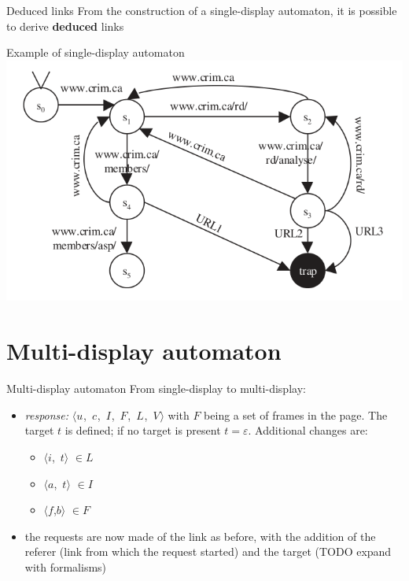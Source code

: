 \documentclass[usenames,dvipsnames]{beamer}
\newcommand{\tuple}[1]{\mbox{$\langle$#1$\rangle$}}
\newcommand{\resmulti}[1][]{
  \ifthenelse{\equal{#1}{}}{\mbox{$\langle u$, $c$, $I$, $F$, $L$, $V\rangle$}}
  {\mbox{$\langle u_{#1}$, $c_{#1}$, $I_{#1}$, $F_{#1}$, $L_{#1}$, $V_{#1}\rangle$}}
}
\theoremstyle{definition}
\begin{document}
\begin{frame}{Deduced links}
  From the construction of a single-display automaton, it is possible to derive \textbf{deduced} links
\end{frame}

\begin{frame}{Example of single-display automaton}
  \includegraphics[width=\textwidth]{../img/session_automaton_example.png}
\end{frame}

\section{Multi-display automaton}
\begin{frame}{Multi-display automaton}
  From single-display to multi-display:
  \begin{itemize}
    \item \textit{response:} \resmulti with $F$ being a set of frames in the page. The target $t$ is defined; if no target is present $t = \varepsilon$. Additional changes are:
      \begin{itemize}
        \item \tuple{$i$, $t$} $\in L$
        \item \tuple{$a$, $t$} $\in I$
        \item \tuple{$f$,$b$} $\in F$
      \end{itemize}
    \item the requests are now made of the link as before, with the addition of the referer (link from which the request started) and the target (TODO expand with formalisms)
  \end{itemize}
\end{frame}
\end{document}
